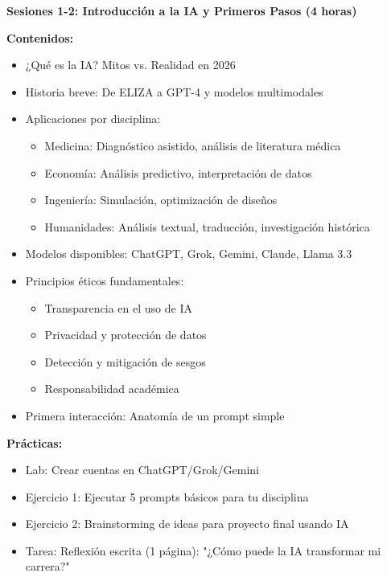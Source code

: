 \documentclass[12pt,a4paper]{yaac-luatex}
\newcommand{\subsecciontitulo}[1]{
	{\color{maincolor}\large\bfseries #1}
}
\begin{document}
	\begin{tcolorbox}[
		enhanced,
		colback=white,
		colframe=curso1color,
		arc=3pt,
		boxrule=1.5pt,
		left=10pt,
		right=10pt,
		top=8pt,
		bottom=8pt,
		breakable
		]
		\subsecciontitulo{Sesiones 1-2: Introducción a la IA y Primeros Pasos (4 horas)}
		
		\textbf{Contenidos:}
		\begin{itemize}[leftmargin=*, itemsep=0.1cm]
			\item ¿Qué es la IA? Mitos vs. Realidad en 2026
			\item Historia breve: De ELIZA a GPT-4 y modelos multimodales
			\item Aplicaciones por disciplina:
			\begin{itemize}
				\item Medicina: Diagnóstico asistido, análisis de literatura médica
				\item Economía: Análisis predictivo, interpretación de datos
				\item Ingeniería: Simulación, optimización de diseños
				\item Humanidades: Análisis textual, traducción, investigación histórica
			\end{itemize}
			\item Modelos disponibles: ChatGPT, Grok, Gemini, Claude, Llama 3.3
			\item Principios éticos fundamentales:
			\begin{itemize}
				\item Transparencia en el uso de IA
				\item Privacidad y protección de datos
				\item Detección y mitigación de sesgos
				\item Responsabilidad académica
			\end{itemize}
			\item Primera interacción: Anatomía de un prompt simple
		\end{itemize}
		
		\textbf{Prácticas:}
		\begin{itemize}[leftmargin=*, itemsep=0.1cm]
			\item Lab: Crear cuentas en ChatGPT/Grok/Gemini
			\item Ejercicio 1: Ejecutar 5 prompts básicos para tu disciplina
			\item Ejercicio 2: Brainstorming de ideas para proyecto final usando IA
			\item Tarea: Reflexión escrita (1 página): "¿Cómo puede la IA transformar mi carrera?"
		\end{itemize}
	\end{tcolorbox}
	
\end{document}
